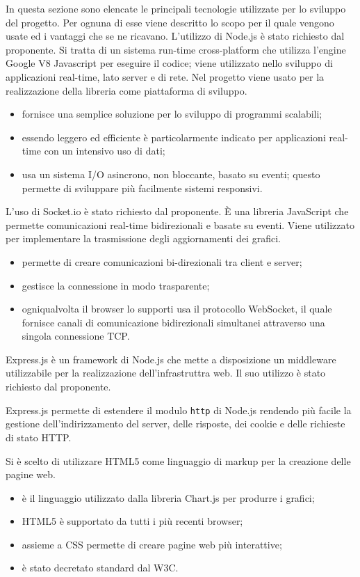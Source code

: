 In questa sezione sono elencate le principali tecnologie utilizzate per lo sviluppo del progetto. Per ognuna di esse viene descritto lo scopo per il quale vengono usate ed i vantaggi che se ne ricavano.
L'utilizzo di Node.js è stato richiesto dal proponente. Si tratta di un sistema run-time cross-platform che utilizza l'engine Google V8 Javascript per eseguire il codice; viene utilizzato nello sviluppo di applicazioni real-time, lato server e di rete. Nel progetto viene usato per la realizzazione della libreria come piattaforma di sviluppo.
\begin{itemize}
\item fornisce una semplice soluzione per lo sviluppo di programmi scalabili;
\item essendo leggero ed efficiente è particolarmente indicato per applicazioni real-time con un intensivo uso di dati;
\item usa un sistema I/O asincrono, non bloccante, basato su eventi; questo permette di sviluppare più facilmente sistemi responsivi.
\end{itemize}

L'uso di Socket.io è stato richiesto dal proponente. È una libreria JavaScript che permette comunicazioni real-time bidirezionali e basate su eventi. Viene utilizzato per implementare la trasmissione degli aggiornamenti dei grafici.
\begin{itemize}
\item permette di creare comunicazioni bi-direzionali tra client e server;
\item gestisce la connessione in modo trasparente;
\item ogniqualvolta il browser lo supporti usa il protocollo WebSocket, il quale fornisce canali di comunicazione bidirezionali simultanei attraverso una singola connessione TCP.
\end{itemize}

Express.js è un framework di Node.js che mette a disposizione un middleware utilizzabile per la realizzazione dell'infrastruttra web. Il suo utilizzo è stato richiesto dal proponente.

Express.js permette di estendere il modulo \texttt{http} di Node.js rendendo più facile la gestione dell'indirizzamento del server, delle risposte, dei cookie e delle richieste di stato HTTP.

Si è scelto di utilizzare HTML5 come linguaggio di markup per la creazione delle pagine web.
\begin{itemize}
\item è il linguaggio utilizzato dalla libreria Chart.js per produrre i grafici;
\item HTML5 è supportato da tutti i più recenti browser;
\item assieme a CSS permette di creare pagine web più interattive;
\item è stato decretato standard dal W3C.
\end{itemize}


